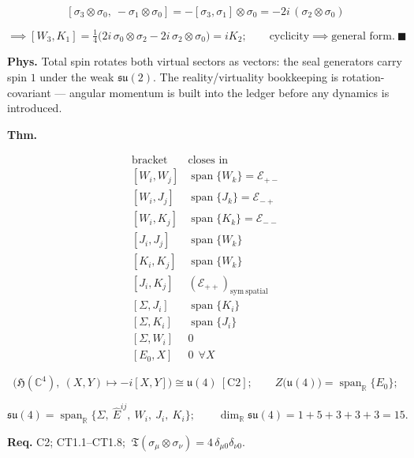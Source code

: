 \begin{theorem}
\[
[\sigma_3\otimes\sigma_0,\ -\sigma_1\otimes\sigma_0]=-[\sigma_3,\sigma_1]\otimes\sigma_0=-2i\,(\sigma_2\otimes\sigma_0)
\]

\[
\implies[W_3,K_1]=\tfrac14\bigl(2i\,\sigma_0\otimes\sigma_2-2i\,\sigma_2\otimes\sigma_0\bigr)=iK_2;\qquad
\text{cyclicity}\implies\text{general form}.\ \blacksquare
\]

\textbf{Phys.} Total spin rotates both virtual sectors as vectors: the seal generators carry spin $1$ under the weak $\mathfrak{su}(2)$. The reality/virtuality bookkeeping is rotation-covariant — angular momentum is built into the ledger before any dynamics is introduced.

\end{theorem}

\begin{theorem}\label{tag:CT1-9}
\textbf{Thm.}

\[
\begin{array}{c|c}
\text{bracket} & \text{closes in}\\ \hline
[W_i,W_j] & \operatorname{span}\{W_k\}=\mathcal E_{+-}\\
{}[W_i,J_j] & \operatorname{span}\{J_k\}=\mathcal E_{-+}\\
{}[W_i,K_j] & \operatorname{span}\{K_k\}=\mathcal E_{--}\\
{}[J_i,J_j] & \operatorname{span}\{W_k\}\\
{}[K_i,K_j] & \operatorname{span}\{W_k\}\\
{}[J_i,K_j] & (\mathcal E_{++})_{\mathrm{sym\ spatial}}\\
{}[\Sigma,J_i] & \operatorname{span}\{K_i\}\\
{}[\Sigma,K_i] & \operatorname{span}\{J_i\}\\
{}[\Sigma,W_i] & 0\\
{}[E_0,X] & 0\ \ \forall X
\end{array}
\]

\[
\bigl(\mathfrak H(\mathbb C^4),\ (X,Y)\mapsto-i[X,Y]\bigr)\cong\mathfrak u(4)\ [\mathrm{C2}];\qquad
Z\bigl(\mathfrak u(4)\bigr)=\operatorname{span}_{\mathbb R}\{E_0\};
\]

\[
\mathfrak{su}(4)=\operatorname{span}_{\mathbb R}\bigl\{\Sigma,\ \hat E^{ij},\ W_i,\ J_i,\ K_i\bigr\};\qquad
\dim_{\mathbb R}\mathfrak{su}(4)=1+5+3+3+3=15 .
\]

\textbf{Req.} C2; CT1.1–CT1.8; $\ \mathfrak T(\sigma_\mu\otimes\sigma_\nu)=4\,\delta_{\mu0}\delta_{\nu0}$.


\end{theorem}
